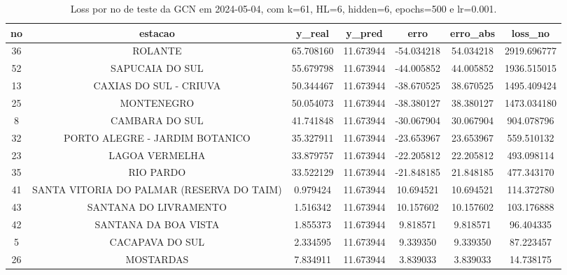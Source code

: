 \begin{table}[h]
\centering
\caption{Loss por no de teste da GCN em 2024-05-04, com k=61, HL=6, hidden=6, epochs=500 e lr=0.001.}
\label{tab:gcn_loss_k61_hl6_h6_e500_d20240504}
\begin{tabular}{ccccccc}
\toprule
no & estacao & y\_real & y\_pred & erro & erro\_abs & loss\_no \\
\midrule
36 & ROLANTE & 65.708160 & 11.673944 & -54.034218 & 54.034218 & 2919.696777 \\
52 & SAPUCAIA DO SUL & 55.679798 & 11.673944 & -44.005852 & 44.005852 & 1936.515015 \\
13 & CAXIAS DO SUL - CRIUVA & 50.344467 & 11.673944 & -38.670525 & 38.670525 & 1495.409424 \\
25 & MONTENEGRO & 50.054073 & 11.673944 & -38.380127 & 38.380127 & 1473.034180 \\
8 & CAMBARA DO SUL & 41.741848 & 11.673944 & -30.067904 & 30.067904 & 904.078796 \\
32 & PORTO ALEGRE - JARDIM BOTANICO & 35.327911 & 11.673944 & -23.653967 & 23.653967 & 559.510132 \\
23 & LAGOA VERMELHA & 33.879757 & 11.673944 & -22.205812 & 22.205812 & 493.098114 \\
35 & RIO PARDO & 33.522129 & 11.673944 & -21.848185 & 21.848185 & 477.343170 \\
41 & SANTA VITORIA DO PALMAR (RESERVA DO TAIM) & 0.979424 & 11.673944 & 10.694521 & 10.694521 & 114.372780 \\
43 & SANTANA DO LIVRAMENTO & 1.516342 & 11.673944 & 10.157602 & 10.157602 & 103.176888 \\
42 & SANTANA DA BOA VISTA & 1.855373 & 11.673944 & 9.818571 & 9.818571 & 96.404335 \\
5 & CACAPAVA DO SUL & 2.334595 & 11.673944 & 9.339350 & 9.339350 & 87.223457 \\
26 & MOSTARDAS & 7.834911 & 11.673944 & 3.839033 & 3.839033 & 14.738175 \\
\bottomrule
\end{tabular}
\end{table}
